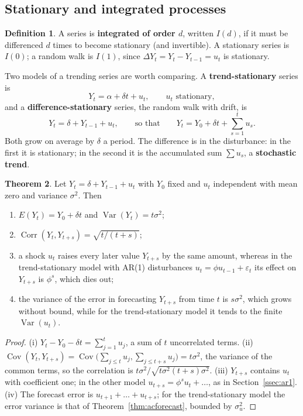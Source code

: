 \documentclass[11pt,a4paper]{article}
\numberwithin{equation}{section}
\DeclareMathOperator{\Var}{Var}
\DeclareMathOperator{\Cov}{Cov}
\DeclareMathOperator{\Corr}{Corr}
\theoremstyle{definition}
\newtheorem{thm}{Theorem}[subsection]
\newtheorem{defn}[thm]{Definition}
\begin{document}
\subsection{Stationary and integrated processes}
\label{ssec:integrated}

\begin{defn}
A series is \textbf{integrated of order $d$}, written $I(d)$, if it must be differenced $d$ times to become stationary (and invertible). A stationary
series is $I(0)$; a random walk is $I(1)$, since $\Delta Y_t = Y_t - Y_{t-1} = u_t$ is stationary.
\end{defn}

Two models of a trending series are worth comparing. A \textbf{trend-stationary} series is
\[
Y_t = \alpha + \delta t + u_t, \qquad u_t \text{ stationary},
\]
and a \textbf{difference-stationary} series, the random walk with drift, is
\[
Y_t = \delta + Y_{t-1} + u_t, \qquad \text{so that} \qquad Y_t = Y_0 + \delta t + \sum_{s=1}^tu_s .
\]
Both grow on average by $\delta$ a period. The difference is in the disturbance: in the first it is stationary; in the second it is the accumulated sum
$\sum u_s$, a \textbf{stochastic trend}.

\begin{thm}
\label{thm:rwmoments}
Let $Y_t = \delta + Y_{t-1} + u_t$ with $Y_0$ fixed and $u_t$ independent with mean zero and variance $\sigma^2$. Then
\begin{enumerate}[label=(\roman*)]
\item $E(Y_t) = Y_0 + \delta t$ and $\Var(Y_t) = t\sigma^2$;
\item $\Corr(Y_t, Y_{t+s}) = \sqrt{t/(t + s)}$;
\item a shock $u_t$ raises every later value $Y_{t+s}$ by the same amount, whereas in the trend-stationary model with AR(1) disturbances
$u_t = \phi u_{t-1} + \varepsilon_t$ its effect on $Y_{t+s}$ is $\phi^s$, which dies out;
\item the variance of the error in forecasting $Y_{t+s}$ from time $t$ is $s\sigma^2$, which grows without bound, while for the trend-stationary model it
tends to the finite $\Var(u_t)$.
\end{enumerate}
\end{thm}

\begin{proof}
(i) $Y_t - Y_0 - \delta t = \sum_{j=1}^tu_j$, a sum of $t$ uncorrelated terms. (ii) $\Cov(Y_t, Y_{t+s}) = \Cov\bigl(\sum_{j\leq t}u_j, \sum_{j\leq t+s}u_j\bigr) = t\sigma^2$, the variance of the common
terms, so the correlation is $t\sigma^2/\sqrt{t\sigma^2(t + s)\sigma^2}$. (iii) $Y_{t+s}$ contains $u_t$ with coefficient one; in the other model $u_{t+s} = \phi^su_t + \dots$, as in
Section~\ref{ssec:ar1}. (iv) The forecast error is $u_{t+1} + \dots + u_{t+s}$; for the trend-stationary model the error variance is that of
Theorem~\ref{thm:acforecast}, bounded by $\sigma_u^2$.
\end{proof}
\end{document}
